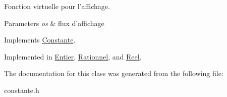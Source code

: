 Fonction virtuelle pour l'affichage. 


\begin{DoxyParams}{Parameters}
{\em os} & flux d'affichage \\
\hline
\end{DoxyParams}


Implements \hyperlink{class_constante_af3be055efee6c5be81ed6a610dbe2082}{Constante}.



Implemented in \hyperlink{class_entier_ab93c84ba0e96feeaf5cbf8bc4fc7c9c3}{Entier}, \hyperlink{class_rationnel_a52b4a6398d50e630ad76be8be0185f9f}{Rationnel}, and \hyperlink{class_reel_a52eb23de069729bc2f8b8b2c18e1be7d}{Reel}.



The documentation for this class was generated from the following file\-:\begin{DoxyCompactItemize}
\item 
constante.\-h\end{DoxyCompactItemize}
